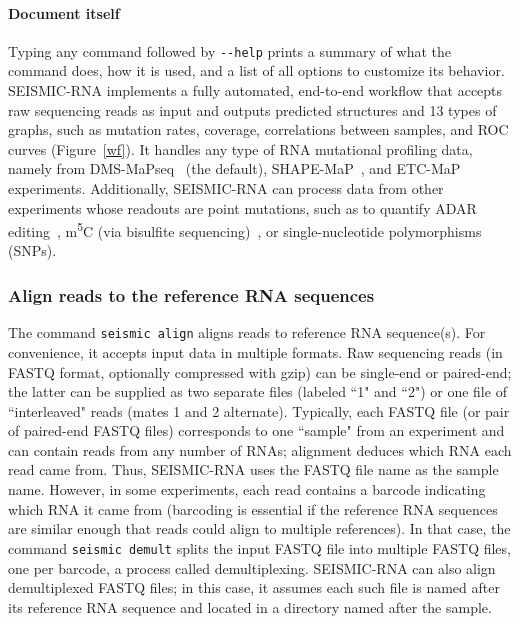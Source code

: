 \documentclass[11pt]{article}
\begin{document}
\paragraph{Document itself}
Typing any command followed by \verb|--help| prints a summary of what the command does, how it is used, and a list of all options to customize its behavior.
\\

SEISMIC-RNA implements a fully automated, end-to-end workflow that accepts raw sequencing reads as input and outputs predicted structures and 13 types of graphs, such as mutation rates, coverage, correlations between samples, and ROC curves (Figure~\ref{wf}).
It handles any type of RNA mutational profiling data, namely from DMS-MaPseq~\cite{Zubradt2016} (the default), SHAPE-MaP~\cite{Siegfried2014}, and ETC-MaP~\cite{Douds2024} experiments.
Additionally, SEISMIC-RNA can process data from other experiments whose readouts are point mutations, such as to quantify ADAR editing~\cite{Okada2019}, m\textsuperscript{5}C (via bisulfite sequencing)~\cite{Schaefer2008}, or single-nucleotide polymorphisms (SNPs).

\subsubsection{Align reads to the reference RNA sequences}

The command \verb|seismic align| aligns reads to reference RNA sequence(s).
For convenience, it accepts input data in multiple formats.
Raw sequencing reads (in FASTQ format, optionally compressed with gzip) can be single-end or paired-end; the latter can be supplied as two separate files (labeled ``1" and ``2") or one file of ``interleaved" reads (mates 1 and 2 alternate).
Typically, each FASTQ file (or pair of paired-end FASTQ files) corresponds to one ``sample" from an experiment and can contain reads from any number of RNAs; alignment deduces which RNA each read came from.
Thus, SEISMIC-RNA uses the FASTQ file name as the sample name.
However, in some experiments, each read contains a barcode indicating which RNA it came from (barcoding is essential if the reference RNA sequences are similar enough that reads could align to multiple references).
In that case, the command \verb|seismic demult| splits the input FASTQ file into multiple FASTQ files, one per barcode, a process called demultiplexing.
SEISMIC-RNA can also align demultiplexed FASTQ files; in this case, it assumes each such file is named after its reference RNA sequence and located in a directory named after the sample.
\end{document}
